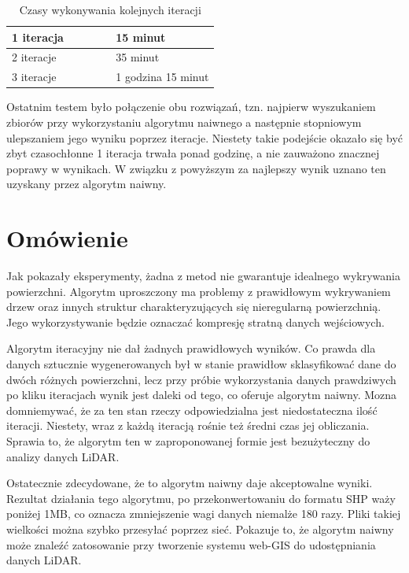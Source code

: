 \begin{table}[h!]
    \centering
    \begin{tabular}{|p{0.5\linewidth}|p{0.5\linewidth}|}
        \hline
		1 iteracja & 15 minut \\
		\hline
		2 iteracje & 35 minut \\
		\hline
		3 iteracje & 1 godzina 15 minut \\
		\hline
    \end{tabular}
    \caption{Czasy wykonywania kolejnych iteracji}
    \label{tab:iter_czasy}
\end{table}


Ostatnim testem było połączenie obu rozwiązań, tzn. najpierw wyszukaniem zbiorów
przy wykorzystaniu algorytmu naiwnego a następnie stopniowym ulepszaniem jego wyniku
poprzez iteracje. Niestety takie podejście okazało się być zbyt czasochłonne 1 iteracja
trwała ponad godzinę, a nie zauważono znacznej poprawy w wynikach. W związku z powyższym
za najlepszy wynik uznano ten uzyskany przez algorytm naiwny.

\section{Omówienie}

Jak pokazały eksperymenty, żadna z metod nie gwarantuje idealnego wykrywania powierzchni. Algorytm
uproszczony ma problemy z prawidłowym wykrywaniem drzew oraz innych struktur charakteryzujących się
nieregularną powierzchnią. Jego wykorzystywanie będzie oznaczać kompresję stratną danych wejściowych.

Algorytm iteracyjny nie dał żadnych prawidłowych wyników. Co prawda dla danych sztucznie wygenerowanych
był w stanie prawidłow sklasyfikować dane do dwóch różnych powierzchni, lecz przy próbie wykorzystania
danych prawdziwych po kliku iteracjach wynik jest daleki od tego, co oferuje algorytm naiwny. Mozna
domniemywać, że za ten stan rzeczy odpowiedzialna jest niedostateczna ilość iteracji. Niestety, wraz
z każdą iteracją rośnie też średni czas jej obliczania. Sprawia to, że algorytm ten w zaproponowanej formie
jest bezużyteczny do analizy danych LiDAR.

Ostatecznie zdecydowane, że to algorytm naiwny daje akceptowalne wyniki. Rezultat działania tego algorytmu,
po przekonwertowaniu do formatu SHP waży poniżej 1MB, co oznacza zmniejszenie wagi danych niemalże 180 razy.
Pliki takiej wielkości można szybko przesyłać poprzez sieć. Pokazuje to, że algorytm naiwny może znaleźć
zatosowanie przy tworzenie systemu web-GIS do udostępniania danych LiDAR.
